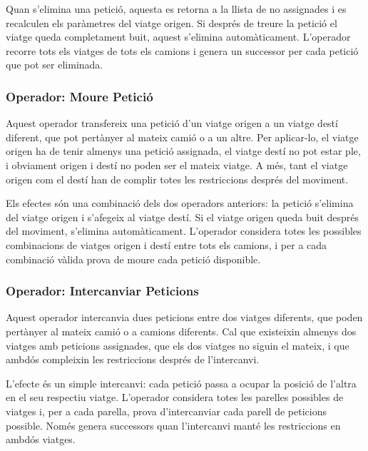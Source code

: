 Quan s'elimina una petició, aquesta es retorna a la llista de no assignades i es recalculen els paràmetres del viatge origen. Si després de treure la petició el viatge queda completament buit, aquest s'elimina automàticament. L'operador recorre tots els viatges de tots els camions i genera un successor per cada petició que pot ser eliminada. 

\vspace{0.5cm}

\subsubsection{Operador: Moure Petició}

Aquest operador transfereix una petició d'un viatge origen a un viatge destí diferent, que pot pertànyer al mateix camió o a un altre. Per aplicar-lo, el viatge origen ha de tenir almenys una petició assignada, el viatge destí no pot estar ple, i obviament origen i destí no poden ser el mateix viatge. A més, tant el viatge origen com el destí han de complir totes les restriccions després del moviment.

Els efectes són una combinació dels dos operadors anteriors: la petició s'elimina del viatge origen i s'afegeix al viatge destí. Si el viatge origen queda buit després del moviment, s'elimina automàticament. L'operador considera totes les possibles combinacions de viatges origen i destí entre tots els camions, i per a cada combinació vàlida prova de moure cada petició disponible.

\vspace{0.5cm}

\subsubsection{Operador: Intercanviar Peticions}

Aquest operador intercanvia dues peticions entre dos viatges diferents, que poden pertànyer al mateix camió o a camions diferents. Cal que existeixin almenys dos viatges amb peticions assignades, que els dos viatges no siguin el mateix, i que ambdós compleixin les restriccions després de l'intercanvi.

L'efecte és un simple intercanvi: cada petició passa a ocupar la posició de l'altra en el seu respectiu viatge. L'operador considera totes les parelles possibles de viatges i, per a cada parella, prova d'intercanviar cada parell de peticions possible. Només genera successors quan l'intercanvi manté les restriccions en ambdós viatges.

